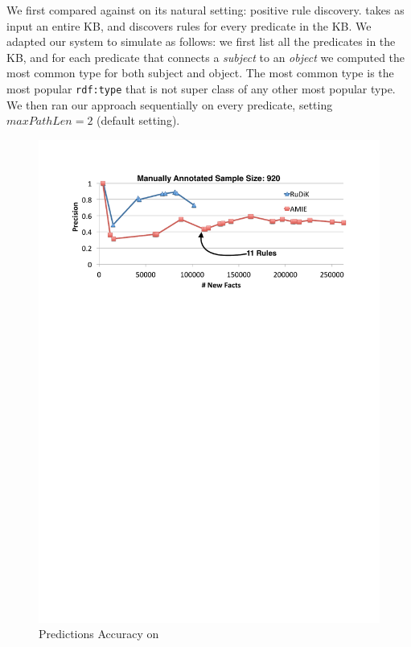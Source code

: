  We first compared \krd against \amie on its natural setting: positive rule discovery. \amie takes as input an entire KB, and discovers rules for every predicate in the KB. We adapted our system to simulate \amie as follows: we first list all the predicates in the KB, and for each predicate that connects a \emph{subject} to an \emph{object} we computed the most common type for both subject and object. The most common type is the most popular \texttt{rdf:type} that is not super class of any other most popular type. We then ran our approach sequentially on every predicate, setting $maxPathLen=2$ (\amie default setting).


\begin{figure}[b]
	\centering
	\vspace{1ex}
	\includegraphics[width=.9\columnwidth]{include/figure/vsAmieYago.pdf}
	\vspace{-2ex}
	\caption{Predictions Accuracy on \yago}
	\label{fig:vs_amie_yago}
\end{figure}


